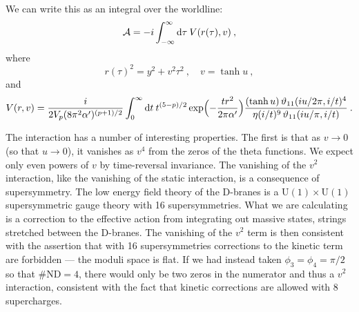 We can write this as an integral over the worldline:
\begin{equation}
	\mathcal{A} = -i\int_{-\infty}^{\infty}\mathrm{d}\tau\:V(r(\tau), v) \:, \label{13.5.4}
\end{equation}
where
\begin{equation}
	r(\tau)^2 = y^2 + v^2\tau^2 \:, \quad v = \tanh u \:, \label{13.5.5}
\end{equation}
and
\begin{equation}
	V(r,v) = \frac{i}{2V_p(8\pi^2\alpha')^{(p+1)/2}}\int_0^\infty \mathrm{d} t\:t^{(5-p)/2}\exp\Bigl(-\frac{t r^2}{2\pi\alpha'}\Bigr)\frac{(\tanh u)\,\vartheta_{11}(i u/2\pi, i/t)^4}{\eta(i/t)^9\,\vartheta_{11}(i u/\pi, i/t)} \:. \label{13.5.6}
\end{equation}

The interaction has a number of interesting properties. The first is that as $v \to 0$ (so that $u \to 0$), it vanishes as $v^4$ from the zeros of the theta functions. We expect only even powers of $v$ by time-reversal invariance. The vanishing of the $v^2$ interaction, like the vanishing of the static interaction, is a consequence of supersymmetry. The low energy field theory of the D-branes is a $\mathrm{U}(1)\times\mathrm{U}(1)$ supersymmetric gauge theory with 16 supersymmetries. What we are calculating is a correction to the effective action from integrating out massive states, strings stretched between the D-branes. The vanishing of the $v^2$ term is then consistent with the assertion that with 16 supersymmetries corrections to the kinetic term are forbidden --- the moduli space is flat. If we had instead taken $\phi_3 = \phi_4 = \pi/2$ so that $\#\mathrm{ND} = 4$, there would only be two zeros in the numerator and thus a $v^2$ interaction, consistent with the fact that kinetic corrections are allowed with 8 supercharges.

